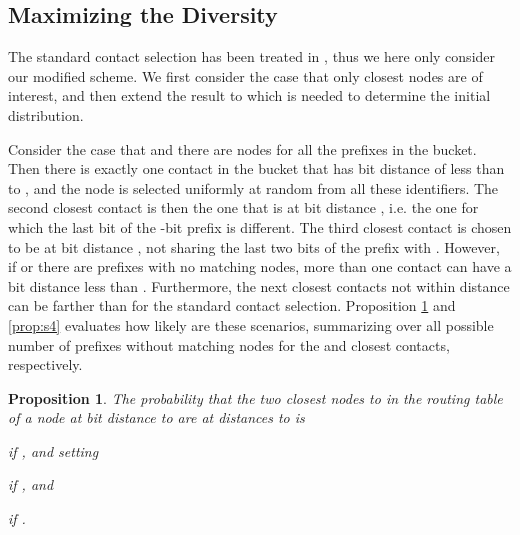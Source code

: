 \documentclass[10pt, conference, compsocconf, letterpaper]{IEEEtran}
\newtheorem{proposition}{Proposition}
\begin{document}
\subsection{Maximizing the Diversity} \label{sec:modeltransition}
The standard contact selection has been treated in \cite{roos13comprehending}, thus we here only consider our modified scheme. We first consider the case that only  closest nodes are of interest, and then extend the result to  which is needed to determine the initial distribution.

Consider the case that  and there are nodes for all the  prefixes in the bucket.
Then there is exactly one contact in the bucket that has bit distance of less than
 to , and the node is selected uniformly at random from all these identifiers.
The second closest contact is then the one that is at bit distance , i.e. the one
for which the last bit of the -bit prefix is different. The third closest contact is chosen to be at bit distance , not sharing the last two bits of the prefix with . However, if  or there are prefixes with no matching nodes, more than one contact can have a bit distance less than . Furthermore, the next closest contacts not within distance  can be farther than for the standard contact selection. 
Proposition \ref{prop:s3} and \ref{prop:s4} evaluates how likely are these scenarios, summarizing over all possible number of prefixes without matching nodes for the  and  closest contacts, respectively.
\vspace{3pt}
\begin{proposition}
\label{prop:s3}
The probability that the two closest nodes to  in the routing table of a node 
at bit distance  to  are at distances  to  is

if , and setting 

if , and

if .
\end{proposition}
\end{document}
